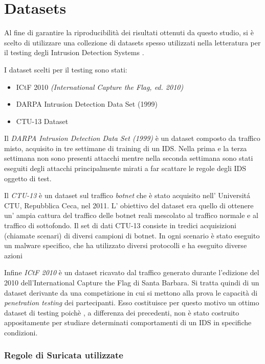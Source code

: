 \documentclass[12pt,a4paper,openright,twoside]{report}
\begin{document}
\section{Datasets}

Al fine di garantire la riproducibilit\`a dei risultati ottenuti da questo studio,
si \`e scelto di utilizzare una collezione di datasets spesso utilizzati nella letteratura
per il testing degli Intrusion Detection Systems \cite{EXP3}.

I dataset scelti per il testing sono stati:
\begin{itemize}
  \item ICtF 2010 {\it (International Capture the Flag, ed. 2010)} \cite{EXP6}
  \item DARPA Intrusion Detection Data Set (1999) \cite{EXP4}
  \item CTU-13 Dataset \cite{EXP5}
\end{itemize}

Il {\it DARPA Intrusion Detection Data Set (1999)} \`e un dataset composto da traffico misto,
 acquisito in tre settimane di training di un IDS. Nella prima e la terza settimana non
sono presenti attacchi mentre nella seconda settimana sono stati eseguiti degli attacchi
principalmente mirati a far scattare le regole degli IDS oggetto di test.

Il {\it CTU-13} \`e un dataset sul traffico {\it botnet} che \`e stato acquisito nell' Universit\'a CTU,
Repubblica Ceca, nel 2011. L' obiettivo del dataset era quello di ottenere un' ampia cattura
del traffico delle botnet reali mescolato al traffico normale e al traffico di sottofondo.
Il set di dati CTU-13 consiste in tredici acquisizioni (chiamate scenari) di diversi campioni
di botnet. In ogni scenario \`e stato eseguito un malware specifico, che ha utilizzato
diversi protocolli e ha eseguito diverse azioni

Infine {\it ICtF 2010} \`e un dataset ricavato dal traffico generato durante l'edizione del
2010 dell'International Capture the Flag di Santa Barbara. Si tratta quindi di un dataset
derivante da una competizione in cui si mettono alla prova le capacit\`a di {\it penetration
testing} dei partecipanti. Esso costituisce per questo motivo un ottimo dataset di testing poich\`e
, a differenza dei precedenti, non \`e stato
costruito appositamente per studiare determinati comportamenti di un IDS in specifiche
condizioni.

\subsubsection{Regole di Suricata utilizzate}\label{sec:regole}
\end{document}
